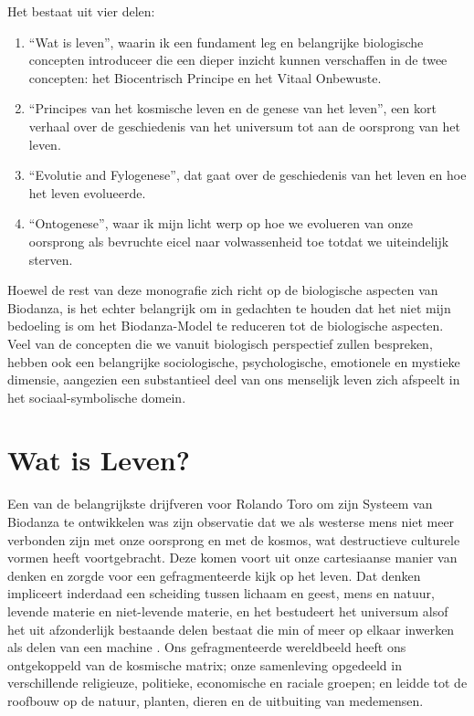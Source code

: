 \documentclass[
  11pt,
]{book}
\begin{document}
Het bestaat uit vier delen:

\begin{enumerate}
\def\labelenumi{\arabic{enumi}.}
\item
  ``Wat is leven'', waarin ik een fundament leg en belangrijke biologische concepten introduceer die een dieper inzicht kunnen verschaffen in de twee concepten: het Biocentrisch Principe en het Vitaal Onbewuste.
\item
  ``Principes van het kosmische leven en de genese van het leven'', een kort verhaal over de geschiedenis van het universum tot aan de oorsprong van het leven.
\item
  ``Evolutie and Fylogenese'', dat gaat over de geschiedenis van het leven en hoe het leven evolueerde.
\item
  ``Ontogenese'', waar ik mijn licht werp op hoe we evolueren van onze oorsprong als bevruchte eicel naar volwassenheid toe totdat we uiteindelijk sterven.
\end{enumerate}

Hoewel de rest van deze monografie zich richt op de biologische aspecten van Biodanza, is het echter belangrijk om in gedachten te houden dat het niet mijn bedoeling is om het Biodanza-Model te reduceren tot de biologische aspecten. Veel van de concepten die we vanuit biologisch perspectief zullen bespreken, hebben ook een belangrijke sociologische, psychologische, emotionele en mystieke dimensie, aangezien een substantieel deel van ons menselijk leven zich afspeelt in het sociaal-symbolische domein.

\hypertarget{wat-is-leven}{%
\chapter{Wat is Leven?}\label{wat-is-leven}}

Een van de belangrijkste drijfveren voor Rolando Toro om zijn Systeem van Biodanza te ontwikkelen was zijn observatie dat we als westerse mens niet meer verbonden zijn met onze oorsprong en met de kosmos, wat destructieve culturele vormen heeft voortgebracht. Deze komen voort uit onze cartesiaanse manier van denken en zorgde voor een gefragmenteerde kijk op het leven. Dat denken impliceert inderdaad een scheiding tussen lichaam en geest, mens en natuur, levende materie en niet-levende materie, en het bestudeert het universum alsof het uit afzonderlijk bestaande delen bestaat die min of meer op elkaar inwerken als delen van een machine \citep{bohm1980}. Ons gefragmenteerde wereldbeeld heeft ons ontgekoppeld van de kosmische matrix; onze samenleving opgedeeld in verschillende religieuze, politieke, economische en raciale groepen; en leidde tot de roofbouw op de natuur, planten, dieren en de uitbuiting van medemensen.
\end{document}

